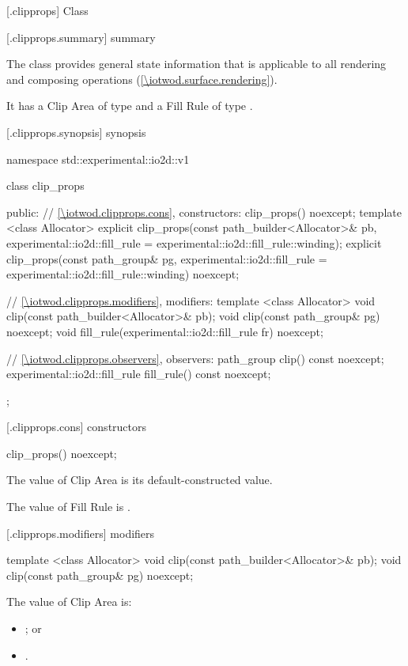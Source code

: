 
 [\iotwod.clipprops] {Class }

 [\iotwod.clipprops.summary] { summary}

\pnum
The  class provides general state information that is applicable to all rendering and composing operations (\ref{\iotwod.surface.rendering}).

\pnum
It has a Clip Area of type  and a Fill Rule of type .

 [\iotwod.clipprops.synopsis] { synopsis}

\begin{codeblock}
namespace std::experimental::io2d::v1 {
  class clip_props {
  public:
    // \ref{\iotwod.clipprops.cons}, constructors:
    clip_props() noexcept;
    template <class Allocator>
    explicit clip_props(const path_builder<Allocator>& pb,
      experimental::io2d::fill_rule = experimental::io2d::fill_rule::winding);
    explicit clip_props(const path_group& pg, experimental::io2d::fill_rule =
      experimental::io2d::fill_rule::winding) noexcept;

    // \ref{\iotwod.clipprops.modifiers}, modifiers:
    template <class Allocator>
    void clip(const path_builder<Allocator>& pb);
    void clip(const path_group& pg) noexcept;
    void fill_rule(experimental::io2d::fill_rule fr) noexcept;
    
    // \ref{\iotwod.clipprops.observers}, observers:
    path_group clip() const noexcept;
    experimental::io2d::fill_rule fill_rule() const noexcept;
  };
}
\end{codeblock}

 [\iotwod.clipprops.cons] { constructors}

\begin{itemdecl}
clip_props() noexcept;
\end{itemdecl}
\begin{itemdescr}
\pnum
\effects
The value of Clip Area is its default-constructed value.

\pnum
The value of Fill Rule is .
\end{itemdescr}

 [\iotwod.clipprops.modifiers] { modifiers}

\begin{itemdecl}
template <class Allocator>
void clip(const path_builder<Allocator>& pb);
void clip(const path_group& pg) noexcept;
\end{itemdecl}
\begin{itemdescr}
\pnum
\effects
The value of Clip Area is:
\begin{itemize}
\item {}; or
\item {}.
\end{itemize}
\end{itemdescr}

